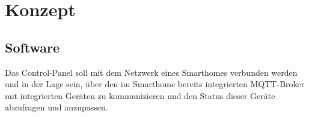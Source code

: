 \chapter{Konzept}
    \section{Software}
        Das Control-Panel soll mit dem Netzwerk eines Smarthomes
        verbunden werden und in der Lage sein, über den im Smarthome 
        bereits integrierten MQTT-Broker mit integrierten Geräten zu 
        kommunizieren und den Status dieser Geräte abzufragen und anzupassen.

        
        
